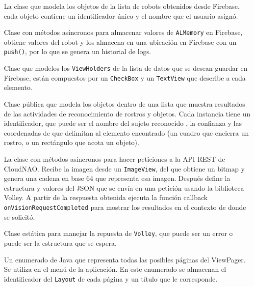 La clase que modela los objetos de la lista de robots obtenidos desde Firebase, cada objeto contiene un identificador único y el nombre que el usuario asignó.


Clase con métodos asíncronos para almacenar valores de \texttt{ALMemory} en Firebase, obtiene valores del robot y los almacena en una ubicación en Firebase con un \texttt{push()}, por lo que se genera un historial de logs.


Clase que modelos los \texttt{ViewHolders} de la lista de datos que se desean guardar en Firebase, están compuestos por un \texttt{CheckBox} y un \texttt{TextView} que describe a cada elemento.


Clase pública que modela los objetos dentro de una lista que muestra resultados de las actividades de reconocimiento de rostros y objetos. Cada instancia tiene un identificador, que puede ser el nombre del sujeto reconocido , la confianza y las coordenadas de que delimitan al elemento encontrado (un cuadro que encierra un rostro, o un rectángulo que acota un objeto).


La clase con métodos asíncronos para hacer peticiones a la API REST 
de CloudNAO. Recibe la imagen desde un \texttt{ImageView}, del que obtiene un 
bitmap y genera una cadena en base 64 que representa esa imagen. 
Después define la estructura y valores del JSON que se envía en una 
petición usando la biblioteca Volley. A partir de la respuesta 
obtenida ejecuta la función callback \texttt{onVisionRequestCompleted} 
para mostrar los resultados en el contexto de donde se solicitó.




Clase estática para manejar la repuesta de \texttt{Volley}, que puede ser un error o puede ser la estructura que se espera.


Un enumerado de Java que representa todas las posibles páginas del ViewPager. Se utiliza en el menú de la aplicación. En este enumerado se almacenan el identificador del \texttt{Layout} de cada página y un título que le corresponde.



